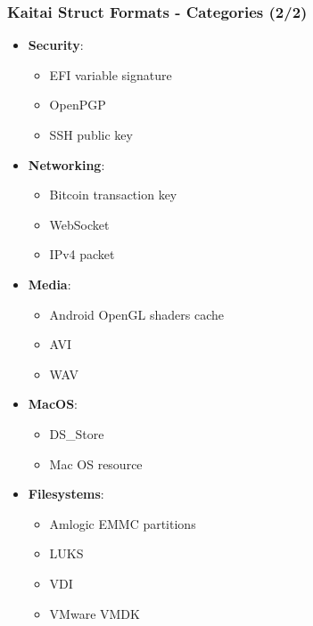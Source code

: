 \begin{frame}
\frametitle{Kaitai Struct Formats - Categories (2/2)}

\begin{itemize}
    \item \textbf{Security}:
          \begin{itemize}
              \item EFI variable signature
              \item OpenPGP
              \item SSH public key
          \end{itemize}
    \item \textbf{Networking}:
          \begin{itemize}
              \item Bitcoin transaction key
              \item WebSocket
              \item IPv4 packet
          \end{itemize}
    \item \textbf{Media}:
          \begin{itemize}
              \item Android OpenGL shaders cache
              \item AVI
              \item WAV
          \end{itemize}
    \item \textbf{MacOS}:
          \begin{itemize}
              \item DS\_Store
              \item Mac OS resource
          \end{itemize}
    \item \textbf{Filesystems}:
          \begin{itemize}
              \item Amlogic EMMC partitions
              \item LUKS
              \item VDI
              \item VMware VMDK
          \end{itemize}
\end{itemize}

\end{frame}


